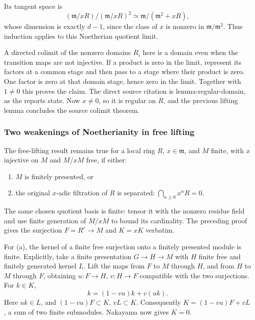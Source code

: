 Its tangent space is \[
 (\mathfrak m/xR)/(\mathfrak m/xR)^2
 \simeq\mathfrak m/(\mathfrak m^2+xR),
\] whose dimension is exactly \(d-1\), since the class of \(x\) is nonzero in \(\mathfrak m/\mathfrak m^2\). Thus induction applies to this Noetherian quotient limit.

A directed colimit of the nonzero domains \(R_i\) here is a domain even when the transition maps are not injective. If a product is zero in the limit, represent its factors at a common stage and then pass to a stage where their product is zero. One factor is zero at that domain stage, hence zero in the limit. Together with \(1\ne0\) this proves the claim. The direct source citation is lemma-regular-domain, as the reports state. Now \(x\ne0\), so it is regular on \(R\), and the previous lifting lemma concludes the source colimit theorem.

\subsubsection{Two weakenings of Noetherianity in free lifting}\label{two-weakenings-of-noetherianity-in-free-lifting}

The free-lifting result remains true for a local ring \(R\), \(x\in\mathfrak m\), and \(M\) finite, with \(x\) injective on \(M\) and \(M/xM\) free, if either:

\begin{enumerate}
\def\labelenumi{(\alph{enumi})}
\item
  \(M\) is finitely presented, or
\item
  the original \(x\)-adic filtration of \(R\) is separated: \(\bigcap_{n\ge0}x^nR=0\).
\end{enumerate}

The same chosen quotient basis is finite: tensor it with the nonzero residue field and use finite generation of \(M/xM\) to bound its cardinality. The preceding proof gives the surjection \(F=R^r\to M\) and \(K=xK\) verbatim.

For (a), the kernel of a finite free surjection onto a finitely presented module is finite. Explicitly, take a finite presentation \(G\to H\to M\) with \(H\) finite free and finitely generated kernel \(L\). Lift the maps from \(F\) to \(M\) through \(H\), and from \(H\) to \(M\) through \(F\), obtaining \(u:F\to H\), \(v:H\to F\) compatible with the two surjections. For \(k\in K\), \[
 k=(1-vu)k+v(uk).
\] Here \(uk\in L\), and \((1-vu)F\subset K\), \(vL\subset K\). Consequently \(K=(1-vu)F+vL\), a sum of two finite submodules. Nakayama now gives \(K=0\).


